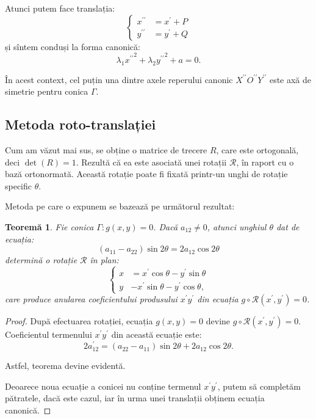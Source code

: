 \documentclass[11pt,a4paper]{article}
\theoremstyle{dotless}
\newtheorem{theorem}{Teorem\u{a}}[section]
\theoremstyle{dotlessdr}
\begin{document}
Atunci putem face translația: 
 \[
	\begin{cases}	
	    x^{\prime\prime} &= x^{\prime} + P \\
	    y^{\prime\prime} &= y^{\prime} + Q
    \end{cases}
\]
și sîntem conduși la forma canonică: 
 \[
	\lambda_1 {x^{\prime\prime}}^2 + \lambda_2 {y^{\prime\prime}}^2 + a = 0.
\]

În acest context, cel puțin una dintre axele reperului canonic
$X^{\prime\prime} O^{\prime\prime} Y^{\prime\prime}$ este axă de simetrie pentru
conica $\Gamma$.


\subsection{Metoda roto-translației}

\indent\indent Cum am văzut mai sus, se obține o matrice de trecere $R$, care
este ortogonală, deci $\det(R) = 1$. Rezultă că ea este asociată unei rotații
$\mathcal{R}$, în raport cu o bază ortonormată. Această rotație poate fi fixată
printr-un unghi de rotație specific $\theta$.

Metoda pe care o expunem se bazează pe următorul rezultat:

\begin{theorem}
	Fie conica $\Gamma: g(x, y) = 0$. Dacă $a_{12} \neq 0$, atunci unghiul
$\theta$ dat de ecuația: 
 \[
	(a_{11} - a_{22}) \sin 2 \theta = 2a_{12} \cos 2 \theta
\]
determină o rotație $\mathcal{R}$ în plan: 
 \[
	\begin{cases}	
	    x &= x^{\prime} \cos \theta - y^{\prime} \sin \theta \\
	    y &- x^{\prime} \sin \theta - y^{\prime} \cos \theta,
    \end{cases}
\]
care produce anularea coeficientului produsului $x^{\prime}y^{\prime}$ din 
ecuația $g \circ \mathcal{R}(x^{\prime}, y^{\prime}) = 0$.
\end{theorem}

\begin{proof}
	După efectuarea rotației, ecuația $g(x, y) = 0$ devine 
$g \circ \mathcal{R}(x^{\prime}, y^{\prime}) = 0$. Coeficientul termenului
$x^{\prime} y^{\prime}$ din această ecuație este: 
 \[
	2a_{12}^{\prime} = (a_{22} - a_{11}) \sin 2 \theta + 2a_{12} \cos 2 \theta.
\]

Astfel, teorema devine evidentă.

Deoarece noua ecuație a conicei nu conține termenul $x^{\prime} y^{\prime}$, 
putem să completăm pătratele, dacă este cazul, iar în urma unei translații
obținem ecuația canonică.
\end{proof}
\end{document}
